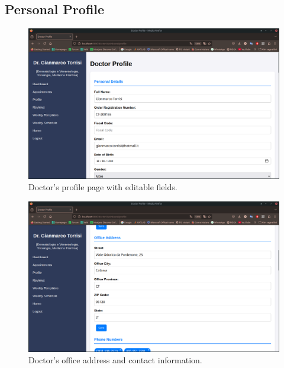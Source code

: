 \subsection{Personal Profile}

\begin{figure}[!h]
    \centering
    \includegraphics[scale=0.30]{resources/screenshots/doctor_ui/personal_info.png}
    \caption{Doctor's profile page with editable fields.}
    \label{fig:doctor_profile}
\end{figure}

\begin{figure}[!h]
    \centering
    \includegraphics[scale=0.30]{resources/screenshots/doctor_ui/address.png}
    \caption{Doctor's office address and contact information.}
    \label{fig:doctor_address}
\end{figure}

